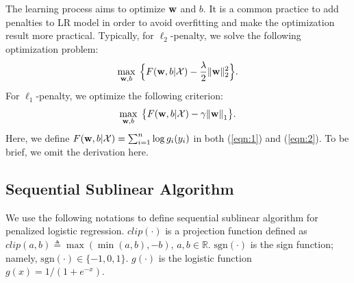 \documentclass[10pt, conference, compsocconf]{IEEEtran}
\newcommand{\bw}{\mathbf{w}}
\newcommand{\lc}{\left(}
\newcommand{\rc}{\right)}
\def\w{{\bf w}}
\def\XM{{\mathcal X}}
\def\sgn{\mathrm{sgn}}
\begin{document}
The learning process aims to optimize $\w$ and $b$.
It is a common practice to add penalties to LR model in order to avoid overfitting and make the optimization result more practical.
Typically, for $\ell_2$-penalty, we solve the following optimization problem:\vspace{-0.2cm}
\begin{equation} \label{eqn:1}
	\max_{\bw ,b} \; \Big\{F(\w, b| \XM) - \frac{\lambda}{2}  \|\bw\|_2^{2} \Big\}.\vspace{-0.2cm}
\end{equation}
For $\ell_1$-penalty, we optimize the following criterion: \vspace{-0.2cm}
\begin{equation} \label{eqn:2}
	\max_{\bw ,b} \;  \big\{F(\w, b|\XM)- \gamma{\|\bw \|}_{1}\big\}.\vspace{-0.2cm}	
\end{equation}
Here, we define $F(\w, b| \XM) = \sum_{i=1}^n \log g_i(y_i)$ in both (\ref{eqn:1}) and (\ref{eqn:2}). To be brief, we omit the derivation here.

\subsection{Sequential Sublinear Algorithm}
We use the following notations to define sequential sublinear algorithm for penalized logistic regression. $clip\lc \cdot \rc$ is a projection function defined as $
clip\lc a,b \rc \triangleq \max \lc \min \lc a,b \rc ,-b\rc,\,a,b\in \mathbb{R}$. $\sgn \lc \cdot \rc$ is the sign function; namely, $\sgn \lc \cdot \rc \in \{-1,0,1\}$.
$g\lc \cdot \rc$ is the logistic function $g \lc x \rc=1/(1+e^{-x})$.
\end{document}
